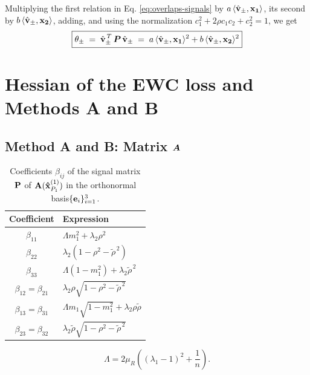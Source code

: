 \medskip
\noindent
Multiplying the first relation in Eq. \eqref{eq:overlaps-signals} by $a\,\langle \hat{\boldsymbol{\mathbf{v}}}_\pm, \boldsymbol{\mathbf{x_1}}\rangle$, its second by $b\,\langle \hat{\boldsymbol{\mathbf{v}}}_\pm, \boldsymbol{\mathbf{x_2}}\rangle$, adding, and using the normalization $c_1^2 + 2\rho c_1 c_2 + c_2^2 = 1$, we get
\begin{equation}
\boxed{
    \theta_\pm \;=\; \hat{\boldsymbol{\mathbf{v}}}_\pm^{\,T}\, \bm{P}\, \hat{\boldsymbol{\mathbf{v}}}_\pm
    \;=\; a\,\langle \hat{\boldsymbol{\mathbf{v}}}_\pm, \boldsymbol{\mathbf{x_1}}\rangle^2 + b\,\langle \hat{\boldsymbol{\mathbf{v}}}_\pm, \boldsymbol{\mathbf{x_2}}\rangle^2}
    \label{eq:theta-pm-relation}
\end{equation}

\section{Hessian of the EWC loss and Methods A and B}\label{adix:hessian}
\subsection{Method A and B: Matrix $\bm{A}$}\label{tab:coefficients_beta_A(xP1)}

\begin{table}[htbp]
    \centering
    
    
    \renewcommand{\arraystretch}{1.8}
    \begin{tabular}{|c|l|}
        \hline
        Coefficient & Expression \\
        \hline
        $\beta_{11}$
        & $\Lambda m_1^2+\lambda_2\rho^2$ \\

        $\beta_{22}$
        & $\lambda_2(1-\rho^2-\widetilde{\rho}^{\,2})$ \\

        $\beta_{33}$
        & $\Lambda(1-m_1^2)+\lambda_2\widetilde{\rho}^{\,2}$ \\

        $\beta_{12}=\beta_{21}$
        & $\lambda_2\rho\sqrt{1-\rho^2-\widetilde{\rho}^{\,2}}$ \\

        $\beta_{13}=\beta_{31}$
        & $\Lambda m_1\sqrt{1-m_1^2}
        +\lambda_2\rho\widetilde{\rho}$ \\

        $\beta_{23}=\beta_{32}$
        & $\lambda_2\widetilde{\rho}
        \sqrt{1-\rho^2-\widetilde{\rho}^{\,2}}$ \\
        \hline
    \end{tabular}

    \vspace{0.3cm}
    \begin{minipage}{0.9\textwidth}
        \footnotesize
        \[
        \Lambda=2\mu_R\left((\lambda_1-1)^2+\frac{1}{n}\right).
        \]
    \end{minipage}
    \caption{Coefficients $\beta_{ij}$ of the signal matrix $\boldsymbol{\mathbf{P}}$ of $\boldsymbol{\mathbf{A}}(\boldsymbol{\mathbf{ \hat x}}^{(1)}_{P_1})$  in the orthonormal basis$\{\boldsymbol{\mathbf{e}}_i\}_{i=1}^3$.}
    \label{tab:beta_A}

\end{table}

